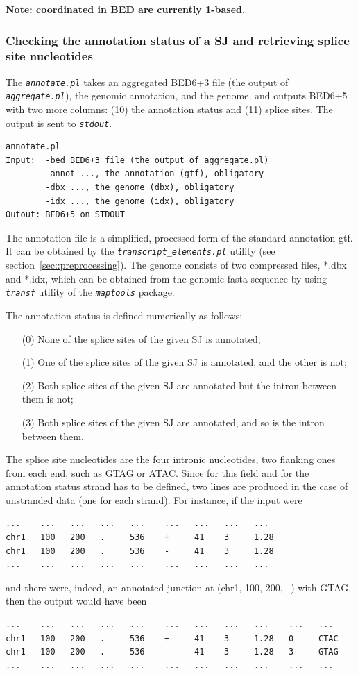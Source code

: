 \documentclass{article}
\newcommand{\prog}[1]{{\tt\em #1}}
\begin{document}
{\bf Note: coordinated in BED are currently 1-based}.


\subsubsection[Annotation status and splice site nucleotides]{Checking the annotation status of a SJ and retrieving splice site nucleotides}
\label{sec::annotation_status}
The \prog{annotate.pl} takes an aggregated BED6+3 file (the output of \prog{aggregate.pl}), the genomic annotation, and the genome, and outputs BED6+5 
with two more columns: (10) the annotation status and (11) splice sites. The output is sent to \prog{stdout}.
\begin{verbatim}
annotate.pl
Input:  -bed BED6+3 file (the output of aggregate.pl) 
        -annot ..., the annotation (gtf), obligatory
        -dbx ..., the genome (dbx), obligatory
        -idx ..., the genome (idx), obligatory
Outout: BED6+5 on STDOUT
\end{verbatim}
The annotation file is a simplified, processed form of the standard annotation gtf. It can be obtained by the \prog{transcript\_elements.pl} utility (see section~\ref{sec::preprocessing}).
The genome consists of two compressed files, *.dbx and *.idx, which can be obtained from the genomic fasta sequence by using \prog{transf} utility of the \prog{maptools} package. 

The annotation status is defined numerically as follows:
\begin{enumerate}
\item[(0)] None of the splice sites of the given SJ is annotated;
\item[(1)] One of the splice sites of the given SJ is annotated, and the other is not;
\item[(2)] Both splice sites of the given SJ are annotated but the intron between them is not;
\item[(3)] Both splice sites of the given SJ are annotated, and so is the intron between them.
\end{enumerate}

The splice site nucleotides are the four intronic nucleotides, two flanking ones from each end, such as GTAG or ATAC. Since for this field and for the annotation status strand 
has to be defined, two lines are produced in the case of unstranded data (one for each strand). For instance, if the input were
\begin{verbatim}
...    ...   ...   ...   ...    ...   ...   ...   ...
chr1   100   200   .     536    +     41    3     1.28
chr1   100   200   .     536    -     41    3     1.28
...    ...   ...   ...   ...    ...   ...   ...   ...
\end{verbatim}
and there were, indeed, an annotated junction at (chr1, 100, 200, --) with GTAG, then the output would have been
\begin{verbatim}
...    ...   ...   ...   ...    ...   ...   ...   ...    ...   ...
chr1   100   200   .     536    +     41    3     1.28   0     CTAC
chr1   100   200   .     536    -     41    3     1.28   3     GTAG
...    ...   ...   ...   ...    ...   ...   ...   ...    ...   ...
\end{verbatim}
\end{document}
